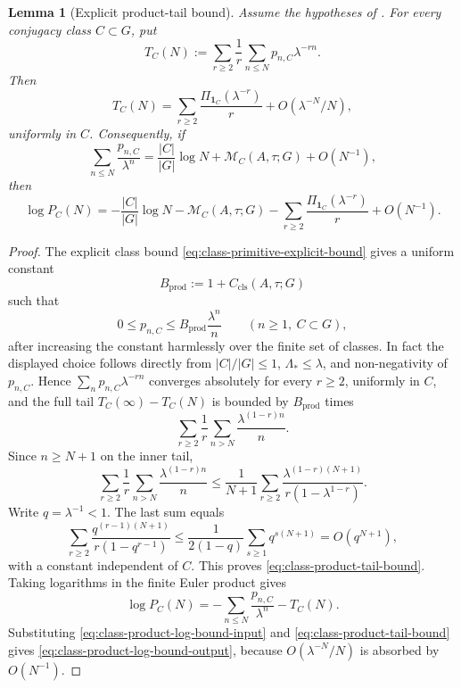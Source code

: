 \documentclass[11pt,a4paper]{amsart}
\theoremstyle{plain}
\newtheorem{lemma}[theorem]{Lemma}
\theoremstyle{definition}
\theoremstyle{remark}
\begin{document}
\begin{lemma}[Explicit product-tail bound]
  \label{lem:class-euler-product-tail-bound}
  Assume the hypotheses of .  For every
  conjugacy class \(C\subset G\), put
  \[
    T_C(N):=
      \sum_{r\ge2}\frac1r\sum_{n\le N}p_{n,C}\lambda^{-rn}.
  \]
  Then
  \begin{equation}\label{eq:class-product-tail-bound}
    T_C(N)=
      \sum_{r\ge2}\frac{\Pi_{\mathbf1_C}(\lambda^{-r})}{r}
      +O(\lambda^{-N}/N),
  \end{equation}
  uniformly in \(C\). Consequently, if
  \begin{equation}\label{eq:class-product-log-bound-input}
    \sum_{n\le N}\frac{p_{n,C}}{\lambda^n}
    =
    \frac{|C|}{|G|}\log N+\mathcal M_C(A,\tau;G)+O(N^{-1}),
  \end{equation}
  then
  \begin{equation}\label{eq:class-product-log-bound-output}
    \log P_C(N)=
    -\frac{|C|}{|G|}\log N
    -\mathcal M_C(A,\tau;G)
    -\sum_{r\ge2}\frac{\Pi_{\mathbf1_C}(\lambda^{-r})}{r}
    +O(N^{-1}).
  \end{equation}
\end{lemma}

\begin{proof}
  The explicit class bound \eqref{eq:class-primitive-explicit-bound} gives a
  uniform constant
  \[
    B_{\mathrm{prod}}:=
    1+C_{\mathrm{cls}}(A,\tau;G)
  \]
  such that
  \[
    0\le p_{n,C}
    \le
    B_{\mathrm{prod}}\frac{\lambda^n}{n}
    \qquad(n\ge1,
    \ C\subset G),
  \]
  after increasing the constant harmlessly over the finite set of classes.  In
  fact the displayed choice follows directly from
  \(|C|/|G|\le1\), \(\Lambda_*\le\lambda\), and non-negativity of
  \(p_{n,C}\).  Hence \(\sum_np_{n,C}\lambda^{-rn}\) converges absolutely for
  every \(r\ge2\), uniformly in \(C\), and the full tail
  \(T_C(\infty)-T_C(N)\) is bounded by
  \(B_{\mathrm{prod}}\) times
  \[
    \sum_{r\ge2}\frac1r\sum_{n>N}\frac{\lambda^{(1-r)n}}{n}.
  \]
  Since \(n\ge N+1\) on the inner tail,
  \[
    \sum_{r\ge2}\frac1r\sum_{n>N}\frac{\lambda^{(1-r)n}}{n}
    \le
    \frac{1}{N+1}
    \sum_{r\ge2}\frac{\lambda^{(1-r)(N+1)}}{r(1-\lambda^{1-r})}.
  \]
  Write \(q=\lambda^{-1}<1\).  The last sum equals
  \[
    \sum_{r\ge2}\frac{q^{(r-1)(N+1)}}{r(1-q^{r-1})}
    \le
    \frac{1}{2(1-q)}\sum_{s\ge1}q^{s(N+1)}
    =O(q^{N+1}),
  \]
  with a constant independent of \(C\).  This proves
  \eqref{eq:class-product-tail-bound}.  Taking logarithms in the finite
  Euler product gives
  \[
    \log P_C(N)=
    -\sum_{n\le N}\frac{p_{n,C}}{\lambda^n}-T_C(N).
  \]
  Substituting \eqref{eq:class-product-log-bound-input} and
  \eqref{eq:class-product-tail-bound} gives
  \eqref{eq:class-product-log-bound-output}, because
  \(O(\lambda^{-N}/N)\) is absorbed by \(O(N^{-1})\).
\end{proof}
\end{document}
